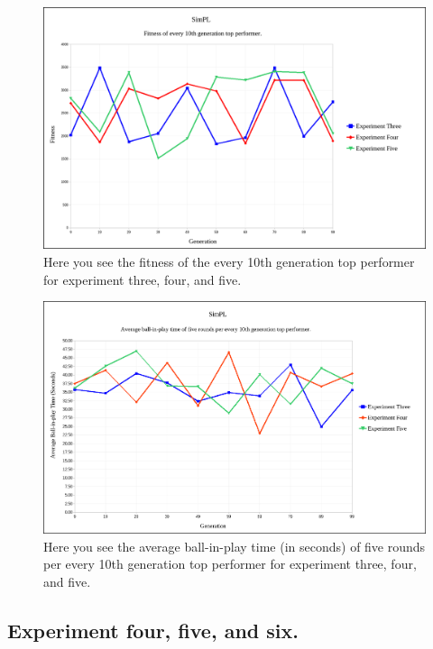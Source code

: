 \documentclass[a4paper,10pt]{article}
\begin{document}
\begin{figure}[H]  
  \centering
  \includegraphics[width=1\textwidth]{figures/exp345_10_tops.png}
  \caption{Here you see the fitness of the every 10th generation top performer for experiment three, four, and five.}
  \label{fig:exp345_10_tops}
\end{figure}

\begin{figure}[H]  
  \centering
  \includegraphics[width=1\textwidth]{figures/exp345_10_tops_times.png}
  \caption{Here you see the average ball-in-play time (in seconds) of five rounds per every 10th generation top performer for experiment three, four, and five.}
  \label{fig:exp345_10_tops_times}
\end{figure}

\subsection{Experiment four, five, and six.}
\end{document}
